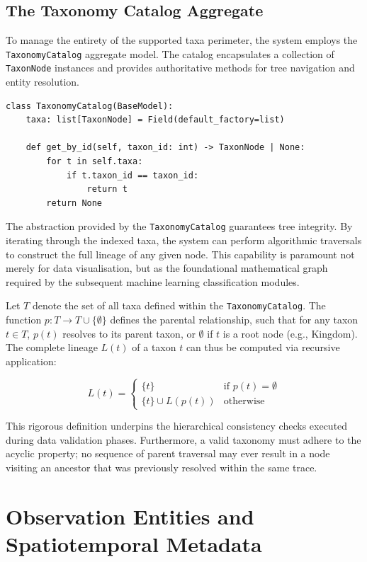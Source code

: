 \subsection{The Taxonomy Catalog Aggregate}
To manage the entirety of the supported taxa perimeter, the system employs the \texttt{TaxonomyCatalog} aggregate model. The catalog encapsulates a collection of \texttt{TaxonNode} instances and provides authoritative methods for tree navigation and entity resolution.

\begin{verbatim}
class TaxonomyCatalog(BaseModel):
    taxa: list[TaxonNode] = Field(default_factory=list)

    def get_by_id(self, taxon_id: int) -> TaxonNode | None:
        for t in self.taxa:
            if t.taxon_id == taxon_id:
                return t
        return None
\end{verbatim}

The abstraction provided by the \texttt{TaxonomyCatalog} guarantees tree integrity. By iterating through the indexed taxa, the system can perform algorithmic traversals to construct the full lineage of any given node. This capability is paramount not merely for data visualisation, but as the foundational mathematical graph required by the subsequent machine learning classification modules.

Let $T$ denote the set of all taxa defined within the \texttt{TaxonomyCatalog}. The function $p: T \rightarrow T \cup \{ \emptyset \}$ defines the parental relationship, such that for any taxon $t \in T$, $p(t)$ resolves to its parent taxon, or $\emptyset$ if $t$ is a root node (e.g., Kingdom). The complete lineage $L(t)$ of a taxon $t$ can thus be computed via recursive application:

\begin{equation}
L(t) = \begin{cases}
\{t\} & \text{if } p(t) = \emptyset \\
\{t\} \cup L(p(t)) & \text{otherwise}
\end{cases}
\end{equation}

This rigorous definition underpins the hierarchical consistency checks executed during data validation phases. Furthermore, a valid taxonomy must adhere to the acyclic property; no sequence of parent traversal may ever result in a node visiting an ancestor that was previously resolved within the same trace.

\section{Observation Entities and Spatiotemporal Metadata}
\label{sec:observation_entities}

